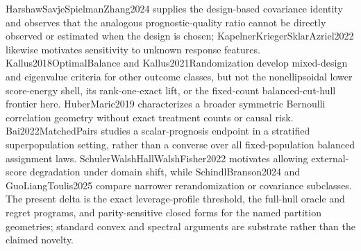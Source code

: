 HarshawSavjeSpielmanZhang2024 supplies the design-based covariance identity and observes that the analogous prognostic-quality ratio cannot be directly observed or estimated when the design is chosen; KapelnerKriegerSklarAzriel2022 likewise motivates sensitivity to unknown response features.  Kallus2018OptimalBalance and Kallus2021Randomization develop mixed-design and eigenvalue criteria for other outcome classes, but not the nonellipsoidal lower score-energy shell, its rank-one-exact lift, or the fixed-count balanced-cut-hull frontier here.  HuberMaric2019 characterizes a broader symmetric Bernoulli correlation geometry without exact treatment counts or causal risk.  Bai2022MatchedPairs studies a scalar-prognosis endpoint in a stratified superpopulation setting, rather than a converse over all fixed-population balanced assignment laws.  SchulerWalshHallWalshFisher2022 motivates allowing external-score degradation under domain shift, while SchindlBranson2024 and GuoLiangToulis2025 compare narrower rerandomization or covariance subclasses.  The present delta is the exact leverage-profile threshold, the full-hull oracle and regret programs, and parity-sensitive closed forms for the named partition geometries; standard convex and spectral arguments are substrate rather than the claimed novelty.